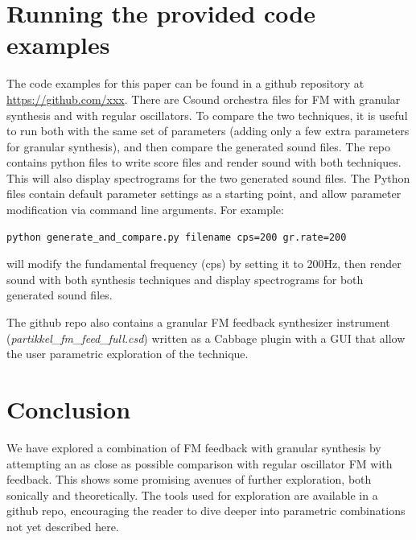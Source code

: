 \documentclass[runningheads,a4paper]{llncs}
\begin{document}
\section{Running the provided code examples}
The code examples for this paper can be found in a github repository at \url{https://github.com/xxx}. There are Csound orchestra files for FM with granular synthesis and with regular oscillators. To compare the two techniques, it is useful to run both with the same set of parameters (adding only a few extra parameters for granular synthesis), and then compare the generated sound files. The repo contains python files to write score files and render sound with both techniques. This will also display spectrograms for the two generated sound files. The Python files contain default parameter settings as a starting point, and allow parameter modification via command line arguments. For example:
\begin{lstlisting}
python generate_and_compare.py filename cps=200 gr.rate=200
\end{lstlisting}
will modify the fundamental frequency (cps) by setting it to 200Hz, then render sound with both synthesis techniques and display spectrograms for both generated sound files. 

The github repo also contains a granular FM feedback synthesizer instrument (\emph{partikkel\_fm\_feed\_full.csd}) written as a Cabbage plugin with a GUI that allow the user parametric exploration of the technique.

\section{Conclusion}
We have explored a combination of FM feedback with granular synthesis by attempting an as close as possible comparison with regular oscillator FM with feedback. This shows some promising avenues of further exploration, both sonically and theoretically. The tools used for exploration are available in a github repo, encouraging the reader to dive deeper into parametric combinations not yet described here.
\end{document}
